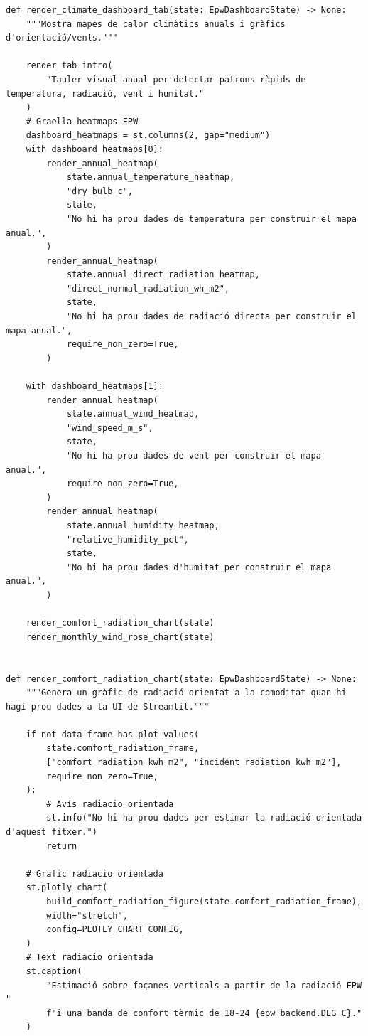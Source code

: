 \documentclass[10pt,a4paper]{article}
\begin{document}
\begin{lstlisting}[style=studioPython,caption={pages/Visor\_Climes\_EPW.py},label={lst:pages-visor-climes-epw-py}]
def render_climate_dashboard_tab(state: EpwDashboardState) -> None:
    """Mostra mapes de calor climàtics anuals i gràfics d'orientació/vents."""

    render_tab_intro(
        "Tauler visual anual per detectar patrons ràpids de temperatura, radiació, vent i humitat."
    )
    # Graella heatmaps EPW
    dashboard_heatmaps = st.columns(2, gap="medium")
    with dashboard_heatmaps[0]:
        render_annual_heatmap(
            state.annual_temperature_heatmap,
            "dry_bulb_c",
            state,
            "No hi ha prou dades de temperatura per construir el mapa anual.",
        )
        render_annual_heatmap(
            state.annual_direct_radiation_heatmap,
            "direct_normal_radiation_wh_m2",
            state,
            "No hi ha prou dades de radiació directa per construir el mapa anual.",
            require_non_zero=True,
        )

    with dashboard_heatmaps[1]:
        render_annual_heatmap(
            state.annual_wind_heatmap,
            "wind_speed_m_s",
            state,
            "No hi ha prou dades de vent per construir el mapa anual.",
            require_non_zero=True,
        )
        render_annual_heatmap(
            state.annual_humidity_heatmap,
            "relative_humidity_pct",
            state,
            "No hi ha prou dades d'humitat per construir el mapa anual.",
        )

    render_comfort_radiation_chart(state)
    render_monthly_wind_rose_chart(state)


def render_comfort_radiation_chart(state: EpwDashboardState) -> None:
    """Genera un gràfic de radiació orientat a la comoditat quan hi hagi prou dades a la UI de Streamlit."""

    if not data_frame_has_plot_values(
        state.comfort_radiation_frame,
        ["comfort_radiation_kwh_m2", "incident_radiation_kwh_m2"],
        require_non_zero=True,
    ):
        # Avís radiacio orientada
        st.info("No hi ha prou dades per estimar la radiació orientada d'aquest fitxer.")
        return

    # Grafic radiacio orientada
    st.plotly_chart(
        build_comfort_radiation_figure(state.comfort_radiation_frame),
        width="stretch",
        config=PLOTLY_CHART_CONFIG,
    )
    # Text radiacio orientada
    st.caption(
        "Estimació sobre façanes verticals a partir de la radiació EPW "
        f"i una banda de confort tèrmic de 18-24 {epw_backend.DEG_C}."
    )



\end{lstlisting}
\end{document}
